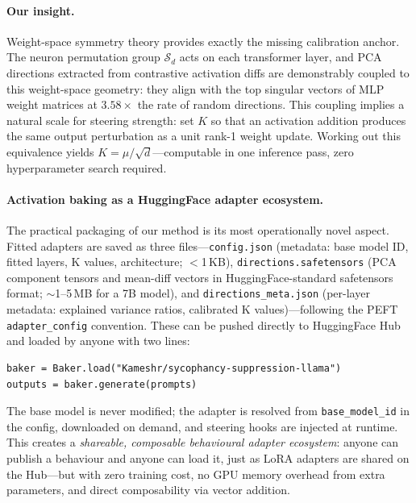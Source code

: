 \documentclass{article}
\begin{document}
\paragraph{Our insight.}
Weight-space symmetry theory provides exactly the missing calibration anchor.
The neuron permutation group $\mathcal{S}_d$ acts on each transformer layer, and
PCA directions extracted from contrastive activation diffs are demonstrably coupled to
this weight-space geometry: they align with the top singular vectors of MLP weight
matrices at $3.58\times$ the rate of random directions.
This coupling implies a natural scale for steering strength: set $K$ so that an
activation addition produces the same output perturbation as a unit rank-1 weight update.
Working out this equivalence yields $K = \mu / \sqrt{d}$—computable in one inference pass,
zero hyperparameter search required.

\paragraph{Activation baking as a HuggingFace adapter ecosystem.}
The practical packaging of our method is its most operationally novel aspect.
Fitted adapters are saved as three files—\texttt{config.json} (metadata: base model ID,
fitted layers, K values, architecture; $<$1\,KB), \texttt{directions.safetensors}
(PCA component tensors and mean-diff vectors in HuggingFace-standard safetensors format;
$\sim$1--5\,MB for a 7B model), and \texttt{directions\_meta.json} (per-layer metadata:
explained variance ratios, calibrated K values)—following the PEFT \texttt{adapter\_config}
convention.
These can be pushed directly to HuggingFace Hub and loaded by anyone with two lines:
\begin{verbatim}
baker = Baker.load("Kameshr/sycophancy-suppression-llama")
outputs = baker.generate(prompts)
\end{verbatim}
The base model is never modified; the adapter is resolved from \texttt{base\_model\_id}
in the config, downloaded on demand, and steering hooks are injected at runtime.
This creates a \emph{shareable, composable behavioural adapter ecosystem}: anyone can
publish a behaviour and anyone can load it, just as LoRA adapters are shared on the Hub—but
with zero training cost, no GPU memory overhead from extra parameters, and
direct composability via vector addition.
\end{document}
